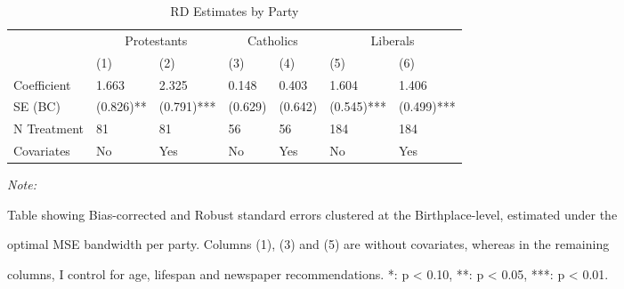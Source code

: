 \begin{table}[!h]

\caption{\label{tab:results_per_party}RD Estimates by Party}
\centering
\fontsize{10}{12}\selectfont
\begin{threeparttable}
\begin{tabular}[t]{lllllll}
\toprule
\multicolumn{1}{c}{ } & \multicolumn{2}{c}{Protestants} & \multicolumn{2}{c}{Catholics} & \multicolumn{2}{c}{Liberals} \\
\cmidrule(l{3pt}r{3pt}){2-3} \cmidrule(l{3pt}r{3pt}){4-5} \cmidrule(l{3pt}r{3pt}){6-7}
  & (1) & (2) & (3) & (4) & (5) & (6)\\
\midrule
Coefficient & 1.663 & 2.325 & 0.148 & 0.403 & 1.604 & 1.406\\
SE (BC) & (0.826)** & (0.791)*** & (0.629) & (0.642) & (0.545)*** & (0.499)***\\
N Treatment & 81 & 81 & 56 & 56 & 184 & 184\\
Covariates & No & Yes & No & Yes & No & Yes\\
\bottomrule
\end{tabular}
\begin{tablenotes}[para]
\item \textit{Note: } 
\item Table showing Bias-corrected and Robust standard errors clustered at the Birthplace-level, estimated under the
\item optimal MSE bandwidth per party. Columns (1), (3) and (5) are without covariates, whereas in the remaining
\item columns, I control for age, lifespan and newspaper recommendations. *: p < 0.10, **: p < 0.05, ***: p < 0.01.
\end{tablenotes}
\end{threeparttable}
\end{table}
